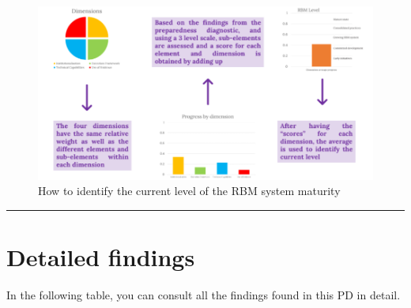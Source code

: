 \documentclass[
  10pt,
]{book}
\begin{document}
\begin{figure}

{\centering \includegraphics[width=1\linewidth]{./images/figure_8} 

}

\caption{How to identify the current level of the RBM system maturity}\label{fig:figure8}
\end{figure}

\begin{center}\rule{0.5\linewidth}{0.5pt}\end{center}

\hypertarget{appendixB}{%
\chapter{Detailed findings}\label{appendixB}}

In the following table, you can consult all the findings found in this PD in detail.
\end{document}
